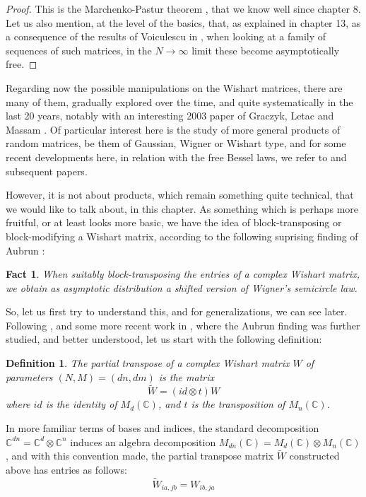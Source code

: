 \documentclass[12pt]{amsbook}
\newtheorem{definition}[theorem]{Definition}
\newtheorem{fact}[theorem]{Fact}
\begin{document}
\begin{proof}
This is the Marchenko-Pastur theorem \cite{mpa}, that we know well since chapter 8. Let us also mention, at the level of the basics, that, as explained in chapter 13, as a consequence of the results of Voiculescu in \cite{vo3}, when looking at a family of sequences of such matrices, in the $N\to\infty$ limit these become asymptotically free. 
\end{proof}

Regarding now the possible manipulations on the Wishart matrices, there are many of them, gradually explored over the time, and quite systematically in the last 20 years, notably with an  interesting 2003 paper of Graczyk, Letac and Massam \cite{glm}. Of particular interest here is the study of more general products of random matrices, be them of Gaussian, Wigner or Wishart type, and for some recent developments here, in relation with the free Bessel laws, we refer to \cite{bb+} and subsequent papers.

\bigskip

However, it is not about products, which remain something quite technical, that we would like to talk about, in this chapter. As something which is perhaps more fruitful, or at least looks more basic, we have the idea of block-transposing or block-modifying a Wishart matrix, according to the following suprising finding of Aubrun \cite{aub}:

\begin{fact}
When suitably block-transposing the entries of a complex Wishart matrix, we obtain as asymptotic distribution a shifted version of Wigner's semicircle law. 
\end{fact}

So, let us first try to understand this, and for generalizations, we can see later. Following \cite{aub}, and some more recent work in \cite{bn1}, where the Aubrun finding was further studied, and better understood, let us start with the following definition:

\begin{definition}
The partial transpose of a complex Wishart matrix $W$ of parameters $(N,M)=(dn,dm)$ is the matrix
$$\widetilde{W}=(id\otimes t)W$$
where $id$ is the identity of $M_d(\mathbb C)$, and $t$ is the transposition of $M_n(\mathbb C)$. 
\end{definition}

In more familiar terms of bases and indices, the standard decomposition $\mathbb C^{dn}=\mathbb C^d\otimes\mathbb C^n$ induces an algebra decomposition $M_{dn}(\mathbb C)=M_d(\mathbb C)\otimes M_n(\mathbb C)$, and with this convention made, the partial transpose matrix $\widetilde{W}$ constructed above has entries as follows:
$$\widetilde{W}_{ia,jb}=W_{ib,ja}$$
\end{document}
